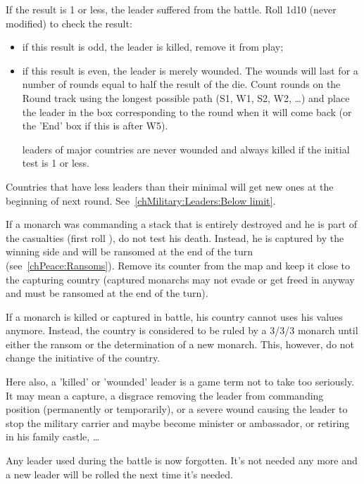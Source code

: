 If the result is 1 or less, the leader suffered from the battle. Roll 1d10
(never modified) to check the result:
\begin{itemize}
\item if this result is odd, the leader is killed, remove it from play;
\item if this result is even, the leader is merely wounded. The wounds will
  last for a number of rounds equal to half the result of the die. Count
  rounds on the Round track using the longest possible path (S1, W1, S2, W2,
  \ldots) and place the leader in the box corresponding to the round when it
  will come back (or the 'End' box if this is after W5).

  \anonyme leaders of major countries are never wounded and always killed if
  the initial test is 1 or less.
\end{itemize}

Countries that have less leaders than their minimal will get new ones at the
beginning of next round. See~\ref{chMilitary:Leaders:Below limit}.

If a monarch was commanding a stack that is entirely destroyed and he is part
of the casualties (first roll ), do not test his death. Instead, he is
captured by the winning side and will be ransomed at the end of the
turn (see~\ref{chPeace:Ransoms}). Remove its counter from the map and keep it
close to the capturing country (captured monarchs may not evade or get freed
in anyway and must be ransomed at the end of the turn).

If a monarch is killed or captured in battle, his country cannot uses his
values anymore. Instead, the country is considered to be ruled by a 3/3/3
monarch until either the ransom or the determination of a new monarch. This,
however, do not change the initiative of the country.

\begin{designnote}
  Here also, a 'killed' or 'wounded' leader is a game term not to take too
  seriously. It may mean a capture, a disgrace removing the leader from
  commanding position (permanently or temporarily), or a severe wound causing
  the leader to stop the military carrier and maybe become minister or
  ambassador, or retiring in his family castle, \ldots
\end{designnote}

Any  leader used during the battle is now forgotten. It's
not needed any more and a new  leader will be rolled the
next time it's needed.

